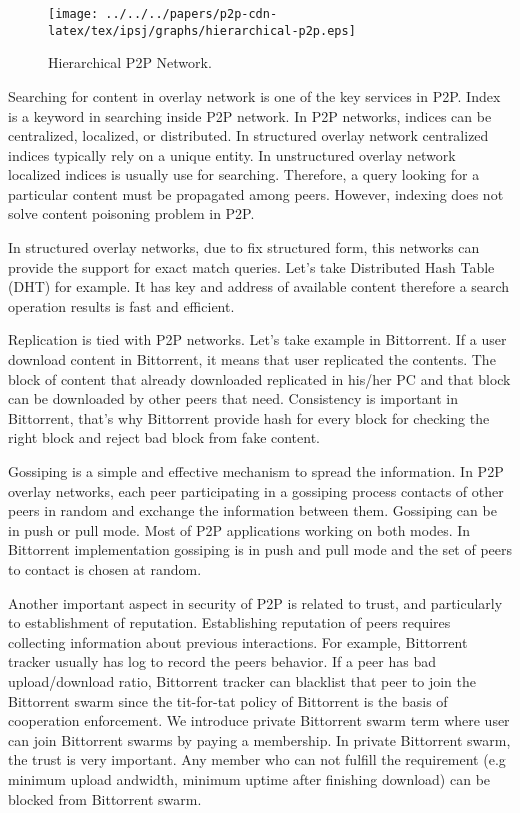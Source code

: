 \begin{figure}[tb]
\begin{center}
\texttt{[image: ../../../papers/p2p-cdn-latex/tex/ipsj/graphs/hierarchical-p2p.eps]}
\end{center}
\caption{Hierarchical P2P Network.} 
\label{fig:hierarchicalp2p}
\end{figure}



Searching for content in overlay network is one of the key services in P2P.
Index is a keyword in searching inside P2P network.
In P2P networks, indices can be centralized, localized, or distributed. 
In structured overlay network centralized indices typically rely on a unique entity.
In unstructured overlay network localized indices is usually use for searching. 
Therefore, a query looking for a particular content must be propagated among peers.
However, indexing does not solve content poisoning problem in P2P.

In structured overlay networks, due to fix structured form, this networks can provide the support for exact match queries.  
Let's take Distributed Hash Table (DHT) for example. 
It has key and address of available content therefore a search operation results is fast and efficient.

Replication is tied with P2P networks.  
Let's take example in Bittorrent.  
If a user download content in Bittorrent,  it means that user replicated the contents.  
The block of content that already downloaded replicated in his/her PC and that block can be downloaded by other peers that need.
Consistency is important in Bittorrent, that's why Bittorrent provide hash for every block for checking the right block and reject bad block from fake content.

Gossiping is a simple and effective mechanism to spread the information. 
In P2P overlay networks, each peer participating in a gossiping process contacts of other peers in random and exchange the information between them.
Gossiping can be in push or pull mode.
Most of P2P applications working on both modes.
In Bittorrent implementation gossiping is in push and pull mode and the set of peers to contact is chosen at random.

Another important aspect in security of P2P is related to trust, and particularly to establishment of reputation. 
Establishing reputation of peers requires collecting information about previous interactions. 
For example, Bittorrent tracker usually has log to record the peers behavior. 
If a peer has bad upload/download ratio, Bittorrent tracker can blacklist that peer to join the Bittorrent swarm since the tit-for-tat policy of Bittorrent is the basis of cooperation enforcement.
We introduce private Bittorrent swarm term where user can join Bittorrent swarms by paying a membership.  
In private Bittorrent swarm, the trust is very important. 
Any member who can not fulfill the requirement (e.g minimum upload andwidth, minimum uptime after finishing download) can be blocked from Bittorrent swarm.

